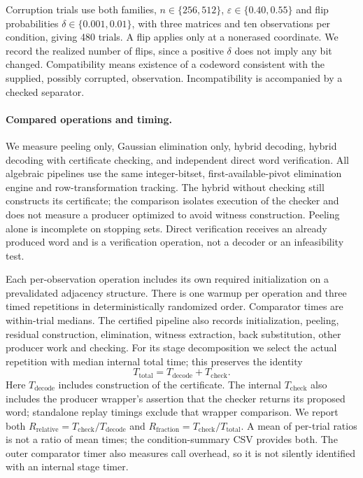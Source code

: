Corruption trials use both families, $n\in\{256,512\}$,
$\varepsilon\in\{0.40,0.55\}$ and flip probabilities
$\delta\in\{0.001,0.01\}$, with three matrices and ten observations
per condition, giving 480 trials. A flip applies only at a nonerased
coordinate. We record the realized number of flips, since a positive
$\delta$ does not imply any bit changed. Compatibility means existence
of a codeword consistent with the supplied, possibly corrupted,
observation. Incompatibility is accompanied by a checked separator.

\paragraph{Compared operations and timing.}
We measure peeling only, Gaussian elimination only, hybrid decoding,
hybrid decoding with certificate checking, and independent direct
word verification. All algebraic pipelines use the same integer-bitset,
first-available-pivot elimination engine and row-transformation tracking.
The hybrid without checking still constructs its certificate; the
comparison isolates execution of the checker and does not measure a
producer optimized to avoid witness construction. Peeling alone is
incomplete on stopping sets. Direct verification receives an already
produced word and is a verification operation, not a decoder or an
infeasibility test.

Each per-observation operation includes its own required initialization
on a prevalidated adjacency structure. There is one warmup per operation
and three timed repetitions in deterministically randomized order.
Comparator times are within-trial medians. The certified pipeline also
records initialization, peeling, residual construction, elimination,
witness extraction, back substitution, other producer work and checking.
For its stage decomposition we select the actual repetition with median
internal total time; this preserves the identity
\[
 T_{\mathrm{total}}=T_{\mathrm{decode}}+T_{\mathrm{check}}.
\]
Here $T_{\mathrm{decode}}$ includes construction of the certificate.
The internal $T_{\mathrm{check}}$ also includes the producer wrapper's
assertion that the checker returns its proposed word; standalone replay
timings exclude that wrapper comparison.
We report both $R_{\mathrm{relative}}=T_{\mathrm{check}}/
T_{\mathrm{decode}}$ and $R_{\mathrm{fraction}}=
T_{\mathrm{check}}/T_{\mathrm{total}}$. A mean of per-trial ratios is
not a ratio of mean times; the condition-summary CSV provides both.
The outer comparator timer also measures call overhead, so it is not
silently identified with an internal stage timer.

